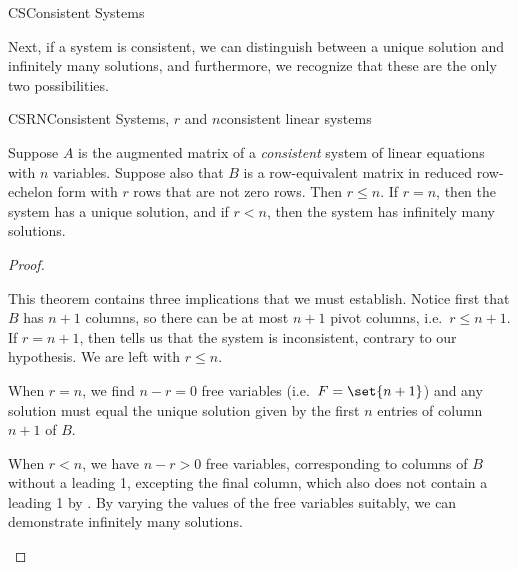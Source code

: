 \begin{subsect}{CS}{Consistent Systems}
%
\begin{para}Next, if a system is consistent, we can distinguish between a unique solution and infinitely many solutions, and furthermore, we recognize that these are the only two possibilities.\end{para}
%
\begin{theorem}{CSRN}{Consistent Systems, $r$ and $n$}{consistent linear systems}
\begin{para}Suppose $A$ is the augmented matrix of a {\em consistent} system of linear equations with $n$ variables.  Suppose also that $B$ is a row-equivalent matrix in reduced row-echelon form with $r$ rows that are not zero rows.  Then $r\leq n$.  If $r=n$, then the system has a unique solution,
and if $r<n$,
then the system has infinitely many solutions.\end{para}
\end{theorem}
%
\begin{proof}
\begin{para}This theorem contains three implications that we must establish.  Notice first that $B$ has $n+1$ columns, so there can be at most $n+1$ pivot columns, i.e.\ $r\leq n+1$.  If $r=n+1$, then  tells us that the system is inconsistent, contrary to our hypothesis. We are left with $r\leq n$.\end{para}
%
\begin{para}When $r=n$, we find $n-r=0$ free variables (i.e.\ $F=\set{n+1}$) and any solution must equal the unique solution given by the first $n$ entries of column $n+1$ of $B$.\end{para}
%
\begin{para}
When $r<n$,
we have $n-r>0$ free variables,
corresponding to columns of $B$ without a leading 1, excepting the final column, which also does not contain a leading 1 by .  By varying the values of the free variables suitably, we can demonstrate infinitely many solutions.\end{para}
\end{proof}
%
\end{subsect}
%
